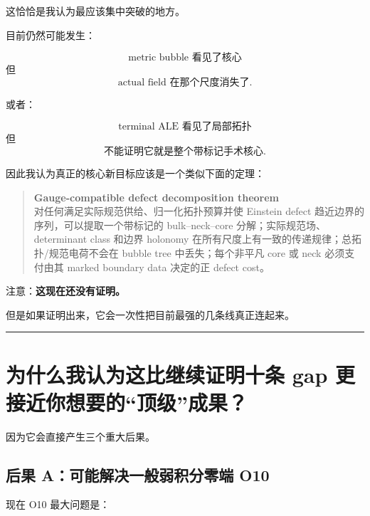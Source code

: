 \documentclass[
  10pt,
]{article}
\begin{document}
这恰恰是我认为最应该集中突破的地方。

目前仍然可能发生：

\[
\text{metric bubble 看见了核心}
\] 但 \[
\text{actual field 在那个尺度消失了}.
\]

或者：

\[
\text{terminal ALE 看见了局部拓扑}
\] 但 \[
\text{不能证明它就是整个带标记手术核心}.
\]

因此我认为真正的核心新目标应该是一个类似下面的定理：

\begin{quote}
\textbf{Gauge-compatible defect decomposition theorem}\\
对任何满足实际规范供给、归一化拓扑预算并使 Einstein defect
趋近边界的序列，可以提取一个带标记的 bulk--neck--core
分解；实际规范场、determinant class 和边界 holonomy
在所有尺度上有一致的传递规律；总拓扑/规范电荷不会在 bubble tree
中丢失；每个非平凡 core 或 neck 必须支付由其 marked boundary data
决定的正 defect cost。
\end{quote}

注意：\textbf{这现在还没有证明。}

但是如果证明出来，它会一次性把目前最强的几条线真正连起来。

\begin{center}\rule{0.5\linewidth}{0.5pt}\end{center}

\hypertarget{ux4e3aux4ec0ux4e48ux6211ux8ba4ux4e3aux8fd9ux6bd4ux7ee7ux7eedux8bc1ux660eux5341ux6761-gap-ux66f4ux63a5ux8fd1ux4f60ux60f3ux8981ux7684ux9876ux7ea7ux6210ux679c}{%
\section{为什么我认为这比继续证明十条 gap
更接近你想要的``顶级''成果？}\label{ux4e3aux4ec0ux4e48ux6211ux8ba4ux4e3aux8fd9ux6bd4ux7ee7ux7eedux8bc1ux660eux5341ux6761-gap-ux66f4ux63a5ux8fd1ux4f60ux60f3ux8981ux7684ux9876ux7ea7ux6210ux679c}}

因为它会直接产生三个重大后果。

\hypertarget{ux540eux679c-aux53efux80fdux89e3ux51b3ux4e00ux822cux5f31ux79efux5206ux96f6ux7aef-o10}{%
\subsection{后果 A：可能解决一般弱积分零端
O10}\label{ux540eux679c-aux53efux80fdux89e3ux51b3ux4e00ux822cux5f31ux79efux5206ux96f6ux7aef-o10}}

现在 O10 最大问题是：
\end{document}
